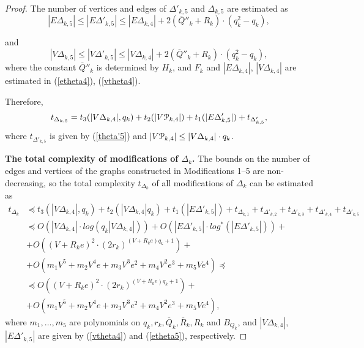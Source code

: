 \documentclass[a4paper,12pt]{article}
\newcommand{\D}{\Delta }
\newcommand{\cP}{{\cal{P}}}
\numberwithin{equation}{section}
\numberwithin{figure}{section}
\begin{document}
\begin{proof}
The number of vertices and edges of $\D'_{k,5}$ and $\D_{k,5}$ are estimated as
\begin{equation}\label{etheta5}
|E\D_{k,5}| \le |E\D'_{k,5}| \le |E\D_{k,4}|+ 2(\overline{Q}''_k+
R_k)\cdot(q_k^2-q_k),
\end{equation}

and
\begin{equation}\label{vtheta5}
|V\D_{k,5}| \le |V \D'_{k,5}| \le |V\D_{k,4}|+2(\overline{Q}''_k+R_k)\cdot(q_k^2-q_k),
\end{equation}
where the constant $\overline{Q}''_k$ is determined by $H_k$, and
$F_k$ and $|E \D_{k,4}|$, $|V \D_{k,4}|$ are estimated in (\ref{etheta4}),
(\ref{vtheta4}).


Therefore,
\begin{equation}\label{theta5}
t_{\D_{k,5}} = t_3(|V \D_{k,4}|, q_k) + t_2(|V\cP_{k,4}|)+ t_1(|E\D'_{k,5}|) +
t_{\D'_{k,5}},
\end{equation}
where $t_{\D'_{k,5}}$ is given by (\ref{theta'5}) and $|V\cP_{k,4}| \le |V
\D_{k,4}|\cdot q_k $.



{\bf The total complexity of modifications of $\D_k$.} 
The bounds on the number of
edges and vertices of the graphs constructed 
in Modifications 1--5 are non-decreasing, so the
total complexity $t_{\D_k}$ 
of all modifications of $\D_k$ can be estimated as
\begin{equation}\label{thetafin}
\begin{split}
t_{\D_k} &\preceq t_3(|V \D_{k,4}|, q_k) + t_2(|V \D_{k,4}| q_k )+
t_1(|E\D'_{k,5}|)+t_{\D_{k,1}} + t_{\D'_{k,2}}+t_{\D'_{k,3}}+t_{\D'_{k,4}}+t_{\D'_{k,5}}\\
&\preceq O(|V \D_{k,4}|\cdot log(q_k |V \D_{k,4}|))+O (|E\D'_{k,5}| \cdot log^{\ast}(|E\D'_{k,5}|))+\\
&+O((V +R_k e)^2\cdot (2r_k)^{(V + R_k e) q_k +1})+\\
&+O(m_1 V^5 + m_2V^4 e +m_3 V^3 e^2 +m_4 V^2 e^3 + m_5 V e^4)\preceq\\
&\preceq O((V +R_k e)^2\cdot (2r_k)^{(V + R_k e) q_k +1})+ \\
&+O(m_1 V^5 + m_2V^4 e +m_3 V^3 e^2 +m_4 V^2 e^3 + m_5 V e^4),
\end{split}
\end{equation}
where $m_1, \ldots, m_5$ are polynomials on  $q_k, r_k,
\overline{Q}_k, \overline{R}_k, R_k$ and $B_{Q_k}$, and $|V
\D_{k,4}|$, $|E\D'_{k,5}|$ are given by (\ref{vtheta4}) and
(\ref{etheta5}), respectively.

\end{proof}
\end{document}

